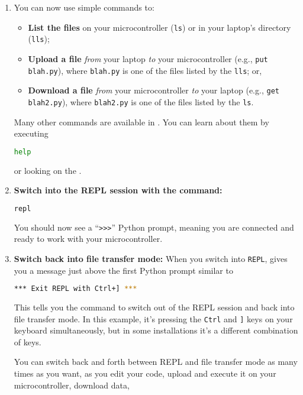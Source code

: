 \begin{enumerate}
\item You can now use simple commands to: \begin{itemize}
	\item \textbf{List the files} on your microcontroller (\texttt{ls}) or in your laptop's directory (\texttt{lls}); 
	\item \textbf{Upload a file} \textit{from} your laptop \textit{to} your microcontroller (e.g., \texttt{put blah.py}), where \texttt{blah.py} is one of the files listed by the \texttt{lls}; or,
	\item \textbf{Download a file} \textit{from} your microcontroller \textit{to} your laptop (e.g., \texttt{get blah2.py}), where \texttt{blah2.py} is one of the files listed by the \texttt{ls}.
\end{itemize} 
Many other commands are available in \mpfshell.
You can learn about them by executing
\begin{lstlisting}[language=bash]
help
\end{lstlisting}
 or looking on the .
\item \textbf{Switch into the REPL session with the command:}
\begin{lstlisting}[language=bash]
repl
\end{lstlisting}
You should now see a ``\verb|>>>|'' Python prompt, meaning you are connected and ready to work with your microcontroller.

\item \textbf{Switch back into file transfer mode:}
When you switch into \texttt{REPL}, \mpfshell gives you a message just above the first Python prompt similar to
\begin{lstlisting}[language=bash]
*** Exit REPL with Ctrl+] ***
\end{lstlisting}
This tells you the command to switch out of the REPL session and back into file transfer mode. In this example, it's pressing the \verb|Ctrl| and \verb|]| keys on your keyboard simultaneously, but in some installations it's a different combination of keys.
 
You can switch back and forth between REPL and file transfer mode as many times as you want, as you edit your code, upload and execute it on your microcontroller, download data, \etc

\end{enumerate}
	  

